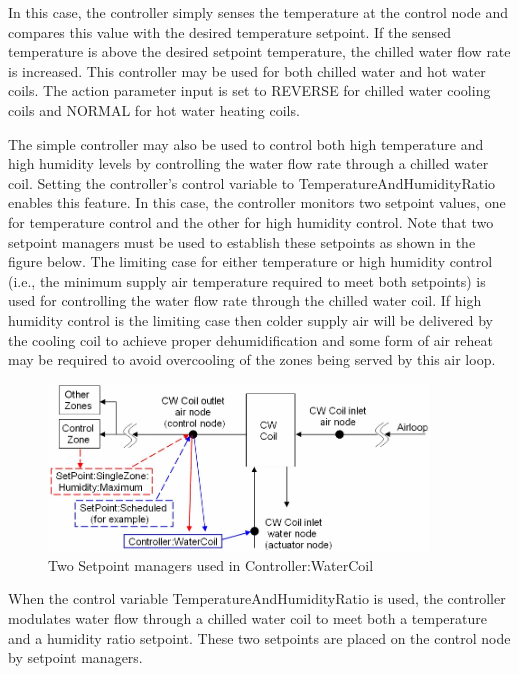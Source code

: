 In this case, the controller simply senses the temperature at the control node and compares this value with the desired temperature setpoint. If the sensed temperature is above the desired setpoint temperature, the chilled water flow rate is increased. This controller may be used for both chilled water and hot water coils. The action parameter input is set to REVERSE for chilled water cooling coils and NORMAL for hot water heating coils.

The simple controller may also be used to control both high temperature and high humidity levels by controlling the water flow rate through a chilled water coil. Setting the controller's control variable to TemperatureAndHumidityRatio enables this feature. In this case, the controller monitors two setpoint values, one for temperature control and the other for high humidity control. Note that two setpoint managers must be used to establish these setpoints as shown in the figure below. The limiting case for either temperature or high humidity control (i.e., the minimum supply air temperature required to meet both setpoints) is used for controlling the water flow rate through the chilled water coil. If high humidity control is the limiting case then colder supply air will be delivered by the cooling coil to achieve proper dehumidification and some form of air reheat may be required to avoid overcooling of the zones being served by this air loop.

\begin{figure}[hbtp] %
\centering
\includegraphics[width=0.9\textwidth, height=0.9\textheight, keepaspectratio=true]{media/image4385.png}
\caption{Two Setpoint managers used in Controller:WaterCoil \protect \label{fig:two-setpoint-managers-used-in-controller}}
\end{figure}

When the control variable TemperatureAndHumidityRatio is used, the controller modulates water flow through a chilled water coil to meet both a temperature and a humidity ratio setpoint. These two setpoints are placed on the control node by setpoint managers.

